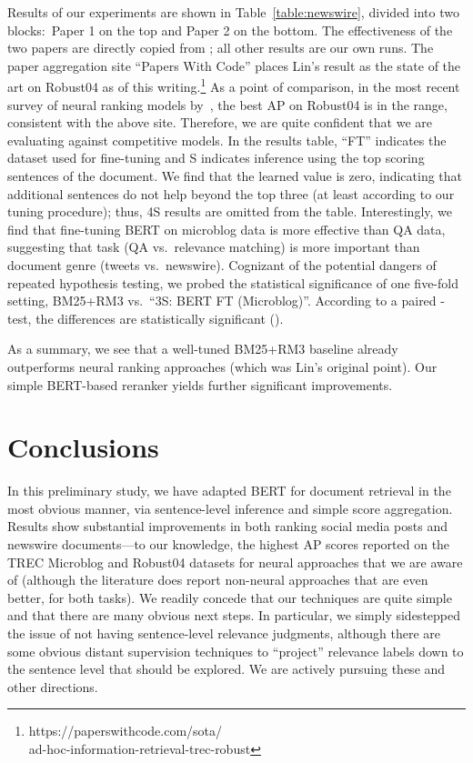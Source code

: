 \documentclass[11pt,a4paper]{article}
\begin{document}
Results of our experiments are shown in Table~\ref{table:newswire}, divided into two blocks:\ Paper 1 on the top and Paper 2 on the bottom.
The effectiveness of the two papers are directly copied from \citet{Lin_SIGIRForum2018}; all other results are our own runs.
The paper aggregation site ``Papers With Code'' places Lin's result as the state of the art on Robust04 as of this writing.\footnote{https://paperswithcode.com/sota/\\ ad-hoc-information-retrieval-trec-robust}
As a point of comparison, in the most recent survey of neural ranking models by~\citet{Guo:1903.06902v1:2019}, the best AP on Robust04 is in the  range, consistent with the above site.
Therefore, we are quite confident that we are evaluating against competitive models.
In the results table, ``FT'' indicates the dataset used for fine-tuning and S indicates inference using the top  scoring sentences of the document.
We find that the learned  value is zero, indicating that additional sentences do not help beyond the top three (at least according to our tuning procedure); thus, 4S results are omitted from the table.
Interestingly, we find that fine-tuning BERT on microblog data is more effective than QA data, suggesting that task (QA vs.\ relevance matching) is more important than document genre (tweets vs.\ newswire).
Cognizant of the potential dangers of repeated hypothesis testing, we probed the statistical significance of one five-fold setting, BM25+RM3 vs.\ ``3S: BERT FT (Microblog)''.
According to a paired -test, the differences are statistically significant ().

As a summary, we see that a well-tuned BM25+RM3 baseline already outperforms neural ranking approaches (which was Lin's original point).
Our simple BERT-based reranker yields further significant improvements.





\section{Conclusions}

In this preliminary study, we have adapted BERT for document retrieval in the most obvious manner, via sentence-level inference and simple score aggregation.
Results show substantial improvements in both ranking social media posts and newswire documents---to our knowledge, the highest AP scores reported on the TREC Microblog and Robust04 datasets for neural approaches that we are aware of (although the literature does report non-neural approaches that are even better, for both tasks).
We readily concede that our techniques are quite simple and that there are many obvious next steps.
In particular, we simply sidestepped the issue of not having sentence-level relevance judgments, although there are some obvious distant supervision techniques to ``project'' relevance labels down to the sentence level that should be explored.
We are actively pursuing these and other directions.
\end{document}
